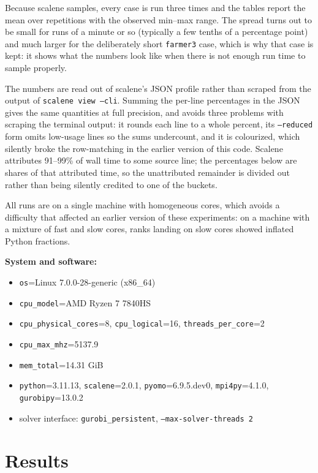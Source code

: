 \documentclass{article}
\begin{document}
Because scalene samples, every case is run three times and the tables
report the mean over repetitions with the observed min--max range. The
spread turns out to be small for runs of a minute or so (typically a
few tenths of a percentage point) and much larger for the deliberately
short \texttt{farmer3} case, which is why that case is kept: it shows
what the numbers look like when there is not enough run time to sample
properly.

The numbers are read out of scalene's JSON profile rather than scraped
from the output of \texttt{scalene view --cli}. Summing the per-line
percentages in the JSON gives the same quantities at full precision,
and avoids three problems with scraping the terminal output: it rounds
each line to a whole percent, its \texttt{--reduced} form omits
low-usage lines so the sums undercount, and it is colourized, which
silently broke the row-matching in the earlier version of this code.
Scalene attributes 91--99\% of wall time to some source line; the
percentages below are shares of that attributed time, so the
unattributed remainder is divided out rather than being silently
credited to one of the buckets.

All runs are on a single machine with homogeneous cores, which avoids a
difficulty that affected an earlier version of these experiments: on a
machine with a mixture of fast and slow cores, ranks landing on slow
cores showed inflated Python fractions.

\noindent\textbf{System and software:}\\
\begin{itemize}
  \item \texttt{os}={Linux 7.0.0-28-generic (x86\_64)}
  \item \texttt{cpu\_model}={AMD Ryzen 7 7840HS}
  \item \texttt{cpu\_physical\_cores}={8}, \texttt{cpu\_logical}={16},
        \texttt{threads\_per\_core}={2}
  \item \texttt{cpu\_max\_mhz}={5137.9}
  \item \texttt{mem\_total}={14.31 GiB}
  \item \texttt{python}={3.11.13}, \texttt{scalene}={2.0.1},
        \texttt{pyomo}={6.9.5.dev0}, \texttt{mpi4py}={4.1.0},
        \texttt{gurobipy}={13.0.2}
  \item solver interface: \texttt{gurobi\_persistent},
        \texttt{--max-solver-threads 2}
\end{itemize}

\section{Results}
\end{document}
